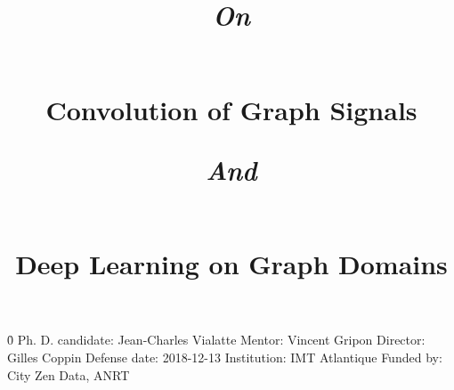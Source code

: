 \documentclass[12pt]{book}
\begin{document}

%
%

\pagestyle{empty}
\newline
\newline \h{0}\newline
Ph. D. candidate: Jean-Charles Vialatte\newline
Mentor: Vincent Gripon\newline
Director: Gilles Coppin\newline
Defense date: 2018-12-13\newline
Institution: IMT Atlantique\newline
Funded by: City Zen Data, ANRT


%
%

\title{\begin{large}\emph{On}\end{large}\\Convolution of Graph Signals\\\begin{large}\emph{And}\end{large}\\Deep Learning on Graph Domains}
\date{}
\maketitle

%
%

\frontmatter
\pagestyle{plain}


%
%

 \dominitoc
 \tableofcontents
 \adjustmtc




% 

%
%

\mainmatter
\pagestyle{headings}

\end{document}
